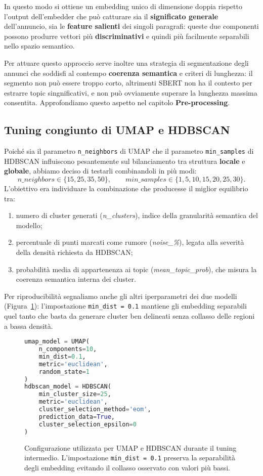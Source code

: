 In questo modo si ottiene un embedding unico di dimensione doppia rispetto l'output dell'embedder che può catturare sia il \textbf{significato generale} dell'annuncio, sia le \textbf{feature salienti} dei singoli paragrafi: queste due componenti possono produrre vettori più \textbf{discriminativi} e quindi più facilmente separabili nello spazio semantico.

Per attuare questo approccio serve inoltre una strategia di segmentazione degli annunci che soddisfi al contempo \textbf{coerenza semantica} e criteri di lunghezza: il segmento non può essere troppo corto, altrimenti SBERT non ha il contesto per estrarre topic singnificativi, e non può ovviamente superare la lunghezza massima consentita. Approfondiamo questo aspetto nel capitolo \textbf{Pre-processing}.

\subsection*{Tuning congiunto di UMAP e HDBSCAN}
Poiché sia il parametro \texttt{n\_neighbors} di UMAP che il parametro \texttt{min\_samples} di HDBSCAN influiscono pesantemente sul bilanciamento tra struttura \textbf{locale} e \textbf{globale}, abbiamo deciso di testarli combinandoli in più modi:
\[
n\_neighbors \in \{15, 25, 35, 50\}, \qquad
min\_samples \in \{1, 5, 10, 15, 20, 25, 30\}.
\]
L'obiettivo era individuare la combinazione che producesse il miglior equilibrio tra:
\begin{enumerate}
    \item numero di cluster generati (\emph{n\_clusters}), indice della granularità semantica del modello;
    \item percentuale di punti marcati come rumore (\emph{noise\_\%}), legata alla severità della densità richiesta da HDBSCAN;
    \item probabilità media di appartenenza ai topic (\emph{mean\_topic\_prob}), che misura la coerenza semantica interna dei cluster.
\end{enumerate}

Per riproducibilità segnaliamo anche gli altri iperparametri dei due modelli (Figura~\ref{fig:umap-hdbscan-config}): l’impostazione \texttt{min\_dist = 0.1} mantiene gli embedding separabili quel tanto che basta da generare cluster ben delineati senza collasso delle regioni a bassa densità.

\begin{figure}[H]
\centering
\begin{lstlisting}[language=Python]
umap_model = UMAP(
    n_components=10,
    min_dist=0.1,
    metric='euclidean',
    random_state=1
)
hdbscan_model = HDBSCAN(
    min_cluster_size=25,
    metric='euclidean',
    cluster_selection_method='eom',
    prediction_data=True,
    cluster_selection_epsilon=0
)
\end{lstlisting}
\caption{Configurazione utilizzata per UMAP e HDBSCAN durante il tuning intermedio. L’impostazione \texttt{min\_dist = 0.1} preserva la separabilità degli embedding evitando il collasso osservato con valori più bassi.}
\label{fig:umap-hdbscan-config}
\end{figure}


